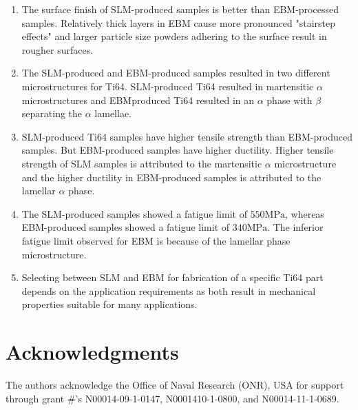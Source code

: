 \documentclass[10pt]{article}
\begin{document}
\begin{enumerate}
  \item The surface finish of SLM-produced samples is better than EBM-processed samples. Relatively thick layers in EBM cause more pronounced "stairstep effects" and larger particle size powders adhering to the surface result in rougher surfaces.

  \item The SLM-produced and EBM-produced samples resulted in two different microstructures for Ti64. SLM-produced Ti64 resulted in martensitic $\alpha$ microstructures and EBMproduced Ti64 resulted in an $\alpha$ phase with $\beta$ separating the $\alpha$ lamellae.

  \item SLM-produced Ti64 samples have higher tensile strength than EBM-produced samples. But EBM-produced samples have higher ductility. Higher tensile strength of SLM samples is attributed to the martensitic $\alpha$ microstructure and the higher ductility in EBM-produced samples is attributed to the lamellar $\alpha$ phase.

  \item The SLM-produced samples showed a fatigue limit of $550 \mathrm{MPa}$, whereas EBM-produced samples showed a fatigue limit of $340 \mathrm{MPa}$. The inferior fatigue limit observed for EBM is because of the lamellar phase microstructure.

  \item Selecting between SLM and EBM for fabrication of a specific Ti64 part depends on the application requirements as both result in mechanical properties suitable for many applications.

\end{enumerate}

\section*{Acknowledgments}
The authors acknowledge the Office of Naval Research (ONR), USA for support through grant \#'s N00014-09-1-0147, N0001410-1-0800, and N00014-11-1-0689.
\end{document}

